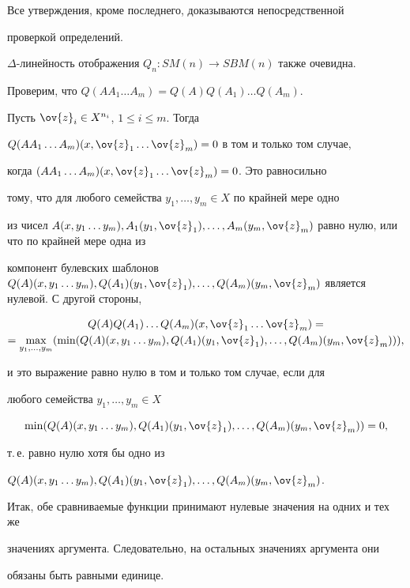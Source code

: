 \begin{pf}


Все утверждения, кроме последнего, доказываются непосредственной


проверкой определений.


$\Delta$-линейность отображения $Q_n: SM(n)\to SBM(n)$ также очевидна.


Проверим, что $Q(AA_1\dotsc A_m)=Q(A)Q(A_1)\dotsc Q(A_m)$.


Пусть $\ov{z}_i\in X^{n_i}$, $1\le i\le m$. Тогда


$Q(AA_1\dotsc A_m)(x,\ov{z}_1\dots\ov{z}_m)=0$ в том и только том случае,


когда $(AA_1\dotsc A_m)(x,\ov{z}_1\dots\ov{z}_m)=0$. Это равносильно


тому, что для любого семейства $y_1,\dotsc, y_m\in X$ по крайней мере одно


из чисел $A(x,y_1\dotsc y_m), A_1(y_1,\ov{z}_1), \dotsc,


A_m(y_m,\ov{z}_m)$ равно нулю, или что по крайней мере одна из


компонент булевских шаблонов $Q(A)(x,y_1\dotsc y_m), Q(A_1)(y_1,\ov{z}_1),


\dotsc, Q(A_m)(y_m,\ov{z}_m)$ является нулевой. С другой стороны,


\begin{multline*}


Q(A)Q(A_1)\dotsc Q(A_m)(x,\ov{z}_1\dotsc\ov{z}_m)= \\


=\max_{y_1,\dotsc,y_m}


(\min(Q(A)(x,y_1\dotsc y_m), Q(A_1)(y_1,\ov{z}_1),


\dotsc,Q(A_m)(y_m,\ov{z}_m))),


\end{multline*}


и это выражение равно нулю в том и только том случае, если для


любого семейства $y_1,\dotsc, y_m{\in} X$ %


$$


\min(Q(A)(x,y_1\dotsc y_m), Q(A_1)(y_1,\ov{z}_1),\dotsc,


Q(A_m)(y_m,\ov{z}_m))=0,


$$


т.\,е. равно нулю хотя бы одно из


$Q(A)(x,y_1\dotsc y_m), Q(A_1)(y_1,\ov{z}_1), \dotsc,


Q(A_m)(y_m,\ov{z}_m)$.


Итак, обе сравниваемые функции принимают нулевые значения на одних и тех же


значениях аргумента. Следовательно, на остальных значениях аргумента они


обязаны быть равными единице.


\end{pf}





